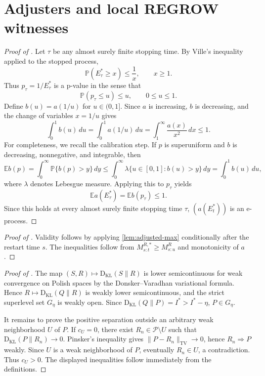 \documentclass[12pt]{article}
\theoremstyle{spaced}
\theoremstyle{remark}
\newcommand{\calP}{\mathcal P}
\newcommand{\KL}{\mathrm{D}_{\text{KL}}}
\begin{document}
\section{Adjusters and local REGROW witnesses}\label{app:proof-local-witnesses}

\begin{proof}[Proof of ]
Let $\tau$ be any almost surely finite stopping time.  By Ville's inequality applied to the stopped process,
\[
  \mathbb P(E_\tau^*\ge x)\le \frac1x,
  \qquad x\ge1.
\]
Thus $p_\tau=1/E_\tau^*$ is a p-value in the sense that
\[
  \mathbb P(p_\tau\le u)\le u,
  \qquad 0\le u\le1.
\]
Define $b(u)=a(1/u)$ for $u\in(0,1]$.  Since $a$ is increasing, $b$ is decreasing, and the change of variables $x=1/u$ gives
\[
  \int_0^1 b(u)\,du
  =\int_0^1 a(1/u)\,du
  =\int_1^\infty \frac{a(x)}{x^2}\,dx\le1.
\]
For completeness, we recall the calibration step.  If $p$ is superuniform and $b$ is decreasing, nonnegative, and integrable, then
\[
  \mathbb E b(p)
  =\int_0^\infty \mathbb P\{b(p)>y\}\,dy
  \le \int_0^\infty \lambda\{u\in[0,1]: b(u)>y\}\,dy
  = \int_0^1 b(u)\,du,
\]
where $\lambda$ denotes Lebesgue measure.  Applying this to $p_\tau$ yields
\[
  \mathbb E a(E_\tau^*)=\mathbb E b(p_\tau)\le1.
\]
Since this holds at every almost surely finite stopping time $\tau$, $(a(E_t^*))$ is an e-process.
\end{proof}

\begin{proof}[Proof of ]
Validity follows by applying \cref{lem:adjusted-max} conditionally after the restart time $s$.  The inequalities follow from $M_{s:t}^{R,*}\ge M_{s:u}^R$ and monotonicity of $a$.
\end{proof}



\begin{proof}[Proof of ]
The map $(S,R)\mapsto\KL(S\|R)$ is lower semicontinuous for weak convergence on Polish spaces by the Donsker--Varadhan variational formula.  Hence $R\mapsto\KL(Q\|R)$ is weakly lower semicontinuous, and the strict superlevel set $G_\eta$ is weakly open.  Since $\KL(Q\|P)=I^*>I^*-\eta$, $P\in G_\eta$.

It remains to prove the positive separation outside an arbitrary weak neighborhood $U$ of $P$.  If $c_U=0$, there exist $R_n\in\calP\setminus U$ such that $\KL(P\|R_n)\to0$.  Pinsker's inequality gives $\|P-R_n\|_{\mathrm{TV}}\to0$, hence $R_n\Rightarrow P$ weakly.  Since $U$ is a weak neighborhood of $P$, eventually $R_n\in U$, a contradiction.  Thus $c_U>0$.  The displayed inequalities follow immediately from the definitions.
\end{proof}
\end{document}
